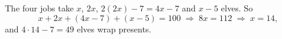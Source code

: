 The four jobs take $x$, $2x$, $2(2x)-7=4x-7$ and $x-5$ elves. So
\[
x+2x+(4x-7)+(x-5)=100\;\Longrightarrow\;8x=112\;\Longrightarrow\;x=14,
\]
and $4\cdot14-7=\boxed{49}$ elves wrap presents.
